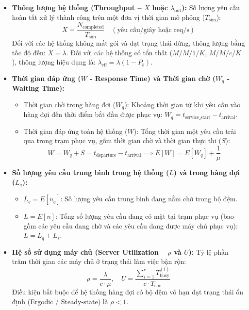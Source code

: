 \begin{itemize}[leftmargin=1.5em]
    \item \textbf{Thông lượng hệ thống (Throughput -- $X$ hoặc $\lambda_{\text{out}}$):} Số lượng yêu cầu hoàn tất xử lý thành công trên một đơn vị thời gian mô phỏng ($T_{\text{sim}}$):
    \begin{equation}
        X = \frac{N_{\text{completed}}}{T_{\text{sim}}} \quad (\text{yêu cầu/giây hoặc req/s})
    \end{equation}
    Đối với các hệ thống không mất gói và đạt trạng thái dừng, thông lượng bằng tốc độ đến: $X = \lambda$. Đối với các hệ thống có tổn thất ($M/M/1/K$, $M/M/c/K$), thông lượng hiệu dụng là: $\lambda_{\text{eff}} = \lambda(1 - P_b)$.
\newpage
    \item \textbf{Thời gian đáp ứng ($W$ - Response Time) và Thời gian chờ ($W_q$ - Waiting Time):}
    \begin{itemize}
        \item Thời gian chờ trong hàng đợi ($W_q$): Khoảng thời gian từ khi yêu cầu vào hàng đợi đến thời điểm bắt đầu được phục vụ: $W_q = t_{\text{service\_start}} - t_{\text{arrival}}$.
        \item Thời gian đáp ứng toàn hệ thống ($W$): Tổng thời gian một yêu cầu trải qua trong trạm phục vụ, gồm thời gian chờ và thời gian thực thi ($S$):
        \begin{equation}
            W = W_q + S = t_{\text{departure}} - t_{\text{arrival}} \implies E[W] = E[W_q] + \frac{1}{\mu}
        \end{equation}
    \end{itemize}

    \item \textbf{Số lượng yêu cầu trung bình trong hệ thống ($L$) và trong hàng đợi ($L_q$):}
    \begin{itemize}
        \item $L_q = E[n_q]$: Số lượng yêu cầu trung bình đang nằm chờ trong bộ đệm.
        \item $L = E[n]$: Tổng số lượng yêu cầu đang có mặt tại trạm phục vụ (bao gồm các yêu cầu đang chờ và các yêu cầu đang được máy chủ phục vụ): $L = L_q + L_s$.
    \end{itemize}

    \item \textbf{Hệ số sử dụng máy chủ (Server Utilization -- $\rho$ và $U$):} Tỷ lệ phần trăm thời gian các máy chủ ở trạng thái làm việc bận rộn:
    \begin{equation}
        \rho = \frac{\lambda}{c \cdot \mu}, \quad U = \frac{\sum_{i=1}^c T_{\text{busy}}^{(i)}}{c \cdot T_{\text{sim}}}
    \end{equation}
    Điều kiện bắt buộc để hệ thống hàng đợi có bộ đệm vô hạn đạt trạng thái ổn định (Ergodic / Steady-state) là $\rho < 1$.


\end{itemize}
